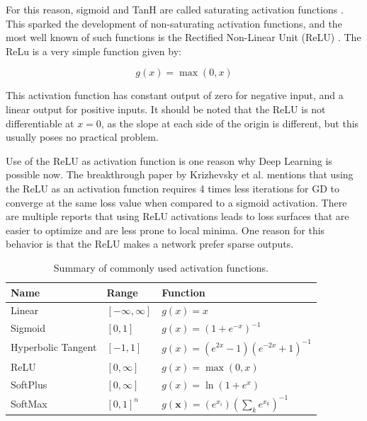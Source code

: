 For this reason, sigmoid and TanH are called saturating activation functions . This sparked the development of non-saturating activation functions, and the most well known of such functions is the Rectified Non-Linear Unit (ReLU) \cite{glorot2011deep}. The ReLu is a very simple function given by:

\begin{equation}
    g(x) = \max(0, x)
    \label{background:relu}
\end{equation}

This  activation function has constant output of zero for negative input, and a linear output for positive inputs. It should be noted that the ReLU is not differentiable at $x = 0$, as the slope at each side of the origin is different, but this usually poses no practical problem.

Use of the ReLU as activation function is one reason why Deep Learning is possible now. The breakthrough paper by Krizhevsky et al. \cite[-8em]{krizhevsky2012imagenet} mentions that using the ReLU as an activation function requires 4 times less iterations for GD to converge at the same loss value when compared to a sigmoid activation. There are multiple reports that using ReLU activations leads to loss surfaces that are easier to optimize and are less prone to local minima. One reason for this behavior is that the ReLU makes a network prefer sparse outputs.

\begin{table}[t]
	\centering
	\begin{tabular}{@{}lll@{}}
		\hline
		Name					& Range 			& Function\\
		\hline
		Linear					& $[-\infty, \infty]$	& $g(x) = x$\\
		Sigmoid					& $[0, 1]$			& $g(x) = (1 + e^{-x})^{-1}$\\
		Hyperbolic Tangent		& $[-1, 1]$			& $g(x) = (e^{2x} -1)(e^{-2x} + 1)^{-1}$\\
		\hline
		ReLU					& $[0, \infty]$		& $g(x) = \max(0, x)$\\
		SoftPlus				& $[0, \infty]$		& $g(x) = \ln(1 + e^x)$\\
		SoftMax					& $[0, 1]^n$		& $g(\textbf{x}) = (e^{x_i}) (\sum_k e^{x_k})^{-1}$\\
		\hline
	\end{tabular}
	\caption{Summary of commonly used activation functions.}
	\label{background:activations}
\end{table}

